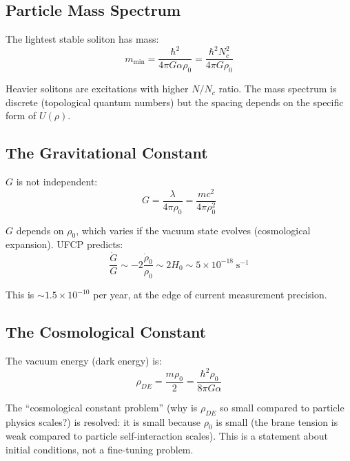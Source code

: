 \documentclass[11pt, a4paper]{article}
\begin{document}
\subsection{Particle Mass Spectrum}

The lightest stable soliton has mass:
\begin{equation}
  m_{\min} = \frac{\hbar^2}{4\pi G\alpha\rho_0}
  = \frac{\hbar^2 N_c^2}{4\pi G\rho_0}
\end{equation}

Heavier solitons are excitations with higher $N/N_c$ ratio.
The mass spectrum is discrete (topological quantum numbers)
but the spacing depends on the specific form of $U(\rho)$.

\subsection{The Gravitational Constant}

$G$ is not independent:
\begin{equation}
  G = \frac{\lambda}{4\pi\rho_0}
  = \frac{mc^2}{4\pi\rho_0^2}
\end{equation}

$G$ depends on $\rho_0$, which varies if the vacuum state
evolves (cosmological expansion). UFCP predicts:
\begin{equation}
  \frac{\dot{G}}{G} \sim -2\frac{\dot{\rho}_0}{\rho_0}
  \sim 2H_0 \sim 5 \times 10^{-18}\;\text{s}^{-1}
\end{equation}

This is $\sim 1.5 \times 10^{-10}$ per year, at the edge of
current measurement precision.

\subsection{The Cosmological Constant}

The vacuum energy (dark energy) is:
\begin{equation}
  \rho_{DE} = \frac{m\rho_0}{2}
  = \frac{\hbar^2\rho_0}{8\pi G\alpha}
\end{equation}

The ``cosmological constant problem'' (why is $\rho_{DE}$ so
small compared to particle physics scales?) is resolved: it is
small because $\rho_0$ is small (the brane tension is weak
compared to particle self-interaction scales). This is a
statement about initial conditions, not a fine-tuning problem.

\end{document}
